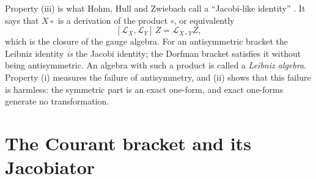 Property (iii) is what Hohm, Hull and Zwiebach call a ``Jacobi-like identity''
. It says that $X\circ{}$ is a derivation of
the product $\circ$, or equivalently
\begin{equation}\label{eq:courant:closureD}
[\mathcal L_X,\mathcal L_Y]\,Z=\mathcal L_{X\circ Y}Z ,
\end{equation}
which is the closure of the gauge algebra. For an antisymmetric bracket the Leibniz identity
\emph{is} the Jacobi identity; the Dorfman bracket satisfies it without being antisymmetric. An
algebra with such a product is called a \emph{Leibniz algebra}. Property
(i) measures the failure of antisymmetry, and (ii) shows that this failure is harmless: the
symmetric part is an exact one-form, and exact one-forms generate no transformation.

\section{The Courant bracket and its Jacobiator}\label{sec:courant:courant}


